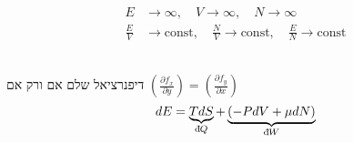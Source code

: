 \begin{cheatformula}
    \begin{align*}
E &\to \infty, \quad V \to \infty, \quad N \to \infty \\
\frac{E}{V} &\to \text{const}, \quad \frac{N}{V} \to \text{const}, \quad \frac{E}{N} \to \text{const}
\end{align*}
\end{cheatformula}

\begin{cheatformula}[דיפרנציאלים]\\
דיפנרציאל שלם אם ורק אם
$ \left( \frac{\partial f_x}{\partial y} \right) = \left( \frac{\partial f_y}{\partial x} \right)$
\[
dE = \underbrace{TdS}_{\mathrm{d}\hspace*{-0.1405em}\bar{}\hspace*{0.1em} Q} + \underbrace{(-PdV + \mu dN)}_{\mathrm{d}\hspace*{-0.1405em}\bar{}\hspace*{0.1em} W}
\]
\end{cheatformula}
